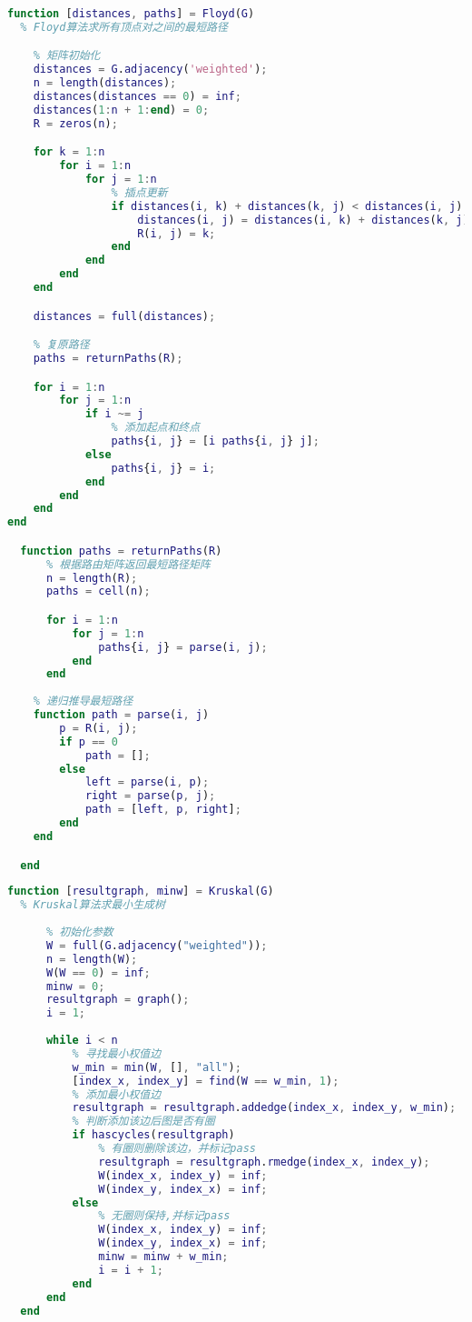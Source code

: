 \documentclass[withoutpreface]{cumcmthesis}
\begin{document}
  \begin{lstlisting}[language=matlab ,caption={Floyd算法} ]
  function [distances, paths] = Floyd(G)
  % Floyd算法求所有顶点对之间的最短路径

    % 矩阵初始化
    distances = G.adjacency('weighted');
    n = length(distances);
    distances(distances == 0) = inf;
    distances(1:n + 1:end) = 0;
    R = zeros(n);

    for k = 1:n
        for i = 1:n
            for j = 1:n
                % 插点更新
                if distances(i, k) + distances(k, j) < distances(i, j)
                    distances(i, j) = distances(i, k) + distances(k, j);
                    R(i, j) = k;
                end
            end
        end
    end

    distances = full(distances);

    % 复原路径
    paths = returnPaths(R);

    for i = 1:n
        for j = 1:n
            if i ~= j
                % 添加起点和终点
                paths{i, j} = [i paths{i, j} j];
            else
                paths{i, j} = i;
            end
        end
    end
end

  function paths = returnPaths(R)
      % 根据路由矩阵返回最短路径矩阵
      n = length(R);
      paths = cell(n);

      for i = 1:n
          for j = 1:n
              paths{i, j} = parse(i, j);
          end
      end
      
    % 递归推导最短路径
    function path = parse(i, j)
        p = R(i, j);
        if p == 0
            path = [];
        else
            left = parse(i, p);
            right = parse(p, j);
            path = [left, p, right];
        end
    end

  end
  \end{lstlisting}

  \begin{lstlisting}[language=matlab ,caption={Kruskal算法} ]
  function [resultgraph, minw] = Kruskal(G)
  % Kruskal算法求最小生成树
  
      % 初始化参数
      W = full(G.adjacency("weighted"));
      n = length(W);
      W(W == 0) = inf;
      minw = 0;
      resultgraph = graph();
      i = 1;
  
      while i < n
          % 寻找最小权值边
          w_min = min(W, [], "all");
          [index_x, index_y] = find(W == w_min, 1);
          % 添加最小权值边
          resultgraph = resultgraph.addedge(index_x, index_y, w_min);
          % 判断添加该边后图是否有圈
          if hascycles(resultgraph)
              % 有圈则删除该边，并标记pass
              resultgraph = resultgraph.rmedge(index_x, index_y);
              W(index_x, index_y) = inf;
              W(index_y, index_x) = inf;
          else
              % 无圈则保持,并标记pass
              W(index_x, index_y) = inf;
              W(index_y, index_x) = inf;
              minw = minw + w_min;
              i = i + 1;
          end
      end
  end
  \end{lstlisting}
\end{document}

